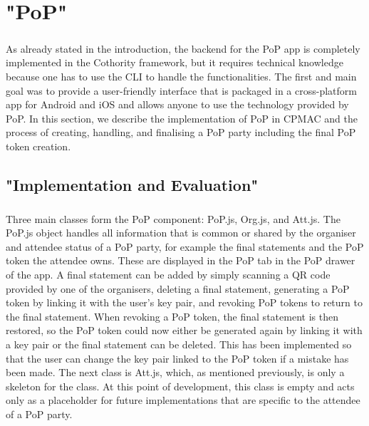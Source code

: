 \chapter{"PoP"}

\paragraph{}
As already stated in the introduction, the backend for the PoP app is completely implemented in the Cothority framework, but it requires technical knowledge because one has to use the CLI to handle the functionalities. The first and main goal was to provide a user-friendly interface that is packaged in a cross-platform app for Android and iOS and allows anyone to use the technology provided by PoP. In this section, we describe the implementation of PoP in CPMAC and the process of creating, handling, and finalising a PoP party including the final PoP token creation.

\section{"Implementation and Evaluation"}

\paragraph{}
Three main classes form the PoP component: PoP.js, Org.js, and Att.js. The PoP.js object handles all information that is common or shared by the organiser and attendee status of a PoP party, for example the final statements and the PoP token the attendee owns. These are displayed in the PoP tab in the PoP drawer of the app. A final statement can be added by simply scanning a QR code provided by one of the organisers, deleting a final statement, generating a PoP token by linking it with the user’s key pair, and revoking PoP tokens to return to the final statement. When revoking a PoP token, the final statement is then restored, so the PoP token could now either be generated again by linking it with a key pair or the final statement can be deleted. This has been implemented so that the user can change the key pair linked to the PoP token if a mistake has been made.
The next class is Att.js, which, as mentioned previously, is only a skeleton for the class. At this point of development, this class is empty and acts only as a placeholder for future implementations that are specific to the attendee of a PoP party.

